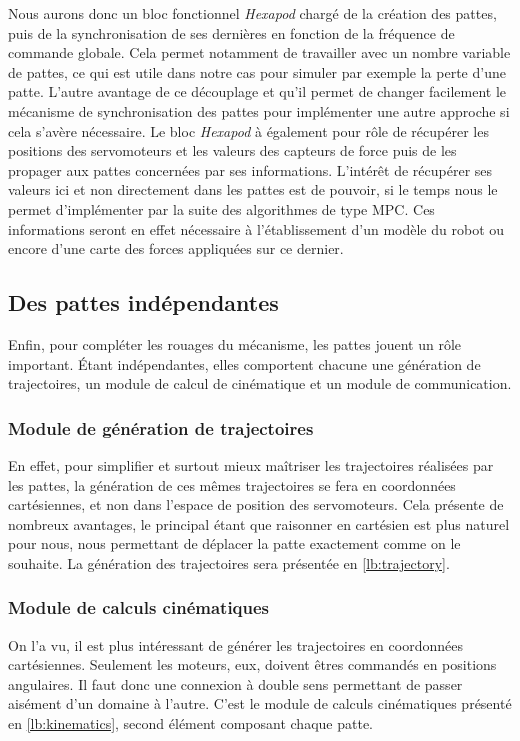 \documentclass{tnreport}
\begin{document}
Nous aurons donc un bloc fonctionnel \textit{Hexapod} chargé de la création des pattes, puis de la synchronisation de ses dernières en fonction de la fréquence de commande globale. Cela permet notamment de travailler avec un nombre variable de pattes, ce qui est utile dans notre cas pour simuler par exemple la perte d'une patte. L'autre avantage de ce découplage et qu'il permet de changer facilement le mécanisme de synchronisation des pattes pour implémenter une autre approche si cela s'avère nécessaire. 
Le bloc \textit{Hexapod} à également pour rôle de récupérer les positions des servomoteurs et les valeurs des capteurs de force puis de les propager aux pattes concernées par ses informations. L'intérêt de récupérer ses valeurs ici et non directement dans les pattes est de pouvoir, si le temps nous le permet d'implémenter par la suite des algorithmes de type \gls{MPC}. Ces informations seront en effet nécessaire à l'établissement d'un modèle du robot ou encore d'une carte des forces appliquées sur ce dernier.   

\subsection{Des pattes indépendantes}
Enfin, pour compléter les rouages du mécanisme, les pattes jouent un rôle important. Étant indépendantes, elles comportent chacune une génération de trajectoires, un module de calcul de cinématique et un module de communication.
\subsubsection{Module de génération de trajectoires}
En effet, pour simplifier et surtout mieux maîtriser les trajectoires réalisées par les pattes, la génération de ces mêmes trajectoires se fera en coordonnées cartésiennes, et non dans l'espace de position des servomoteurs. Cela présente de nombreux avantages, le principal étant que raisonner en cartésien est plus naturel pour nous, nous permettant de déplacer la patte exactement comme on le souhaite. La génération des trajectoires sera présentée en \ref{lb:trajectory}. 
\subsubsection{Module de calculs cinématiques}
On l'a vu, il est plus intéressant de générer les trajectoires en coordonnées cartésiennes. Seulement les moteurs, eux, doivent êtres commandés en positions angulaires. Il faut donc une connexion à double sens permettant de passer aisément d'un domaine à l'autre. C'est le module de calculs cinématiques présenté en \ref{lb:kinematics}, second élément composant chaque patte.
\newpage
\end{document}
